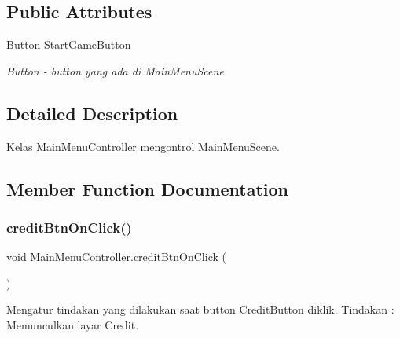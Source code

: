 \subsection*{Public Attributes}
\begin{DoxyCompactItemize}
\item 
Button \hyperlink{class_main_menu_controller_ac8ee65de25015adeee8ee06dca4ff70a}{Start\+Game\+Button}
\begin{DoxyCompactList}\small\item\em Button -\/ button yang ada di Main\+Menu\+Scene. \end{DoxyCompactList}\end{DoxyCompactItemize}


\subsection{Detailed Description}
Kelas \hyperlink{class_main_menu_controller}{Main\+Menu\+Controller} mengontrol Main\+Menu\+Scene. 



\subsection{Member Function Documentation}
\hypertarget{class_main_menu_controller_a62a67c2d468bf4b4b45b1eefac4e08e0}{}\label{class_main_menu_controller_a62a67c2d468bf4b4b45b1eefac4e08e0} 
\subsubsection{\texorpdfstring{credit\+Btn\+On\+Click()}{creditBtnOnClick()}}
{\footnotesize\ttfamily void Main\+Menu\+Controller.\+credit\+Btn\+On\+Click (\begin{DoxyParamCaption}{ }\end{DoxyParamCaption})}



Mengatur tindakan yang dilakukan saat button Credit\+Button diklik. Tindakan \+: Memunculkan layar Credit. 

\hypertarget{class_main_menu_controller_a4d4f79fdc5194e108997fb2b034bc144}{}\label{class_main_menu_controller_a4d4f79fdc5194e108997fb2b034bc144} 
